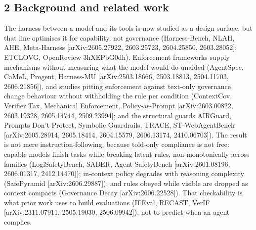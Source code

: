 \documentclass[
]{article}
\begin{document}
\subsection{2 Background and related
work}\label{background-and-related-work}

The harness between a model and its tools is now studied as a design
surface, but that line optimises it for capability, not governance
(Harness-Bench, NLAH, AHE, Meta-Harness {[}arXiv:2605.27922, 2603.25723,
2604.25850, 2603.28052{]}; ETCLOVG, OpenReview 3hXEPbG0dh). Enforcement
frameworks supply mechanisms without measuring what the model would do
unaided (AgentSpec, CaMeL, Progent, Harness-MU {[}arXiv:2503.18666,
2503.18813, 2504.11703, 2606.21856{]}), and studies pitting enforcement
against text-only governance change behaviour without withholding the
rule per condition (ContextCov, Verifier Tax, Mechanical Enforcement,
Policy-as-Prompt {[}arXiv:2603.00822, 2603.19328, 2605.14744,
2509.23994{]}; and the structural guards AIRGuard, Prompts Don't
Protect, Symbolic Guardrails, TRACE, ST-WebAgentBench
{[}arXiv:2605.28914, 2605.18414, 2604.15579, 2606.13174, 2410.06703{]}).
The result is not mere instruction-following, because told-only
compliance is not free: capable models finish tasks while breaking
latent rules, non-monotonically across families (LogiSafetyBench, SABER,
Agent-SafetyBench {[}arXiv:2601.08196, 2606.01317, 2412.14470{]});
in-context policy degrades with reasoning complexity (SafePyramid
{[}arXiv:2606.29887{]}); and rules obeyed while visible are dropped as
context compacts (Governance Decay {[}arXiv:2606.22528{]}). That
checkability is what prior work uses to build evaluations (IFEval,
RECAST, VerIF {[}arXiv:2311.07911, 2505.19030, 2506.09942{]}), not to
predict when an agent complies.
\end{document}

